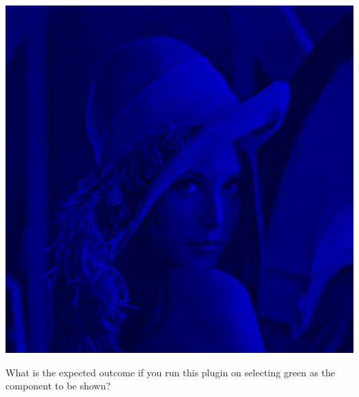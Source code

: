 \documentclass{book}
\begin{document}
\begin{exercise}
\begin{center}
\includegraphics[scale=0.2]{lena-onlyblue.png}
\end{center}
What is the expected outcome if you run this plugin on  selecting green as the component to be shown?
\end{exercise}


\end{document}
